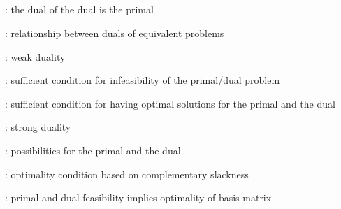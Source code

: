 \subsection*{}
\item {}: the dual of the dual is the primal
\item {}: relationship between duals of equivalent problems
\item {}: weak duality
\item {}: sufficient condition for infeasibility of the primal/dual problem
\item {}: sufficient condition for having optimal
solutions for the primal and the dual
\item {}: strong duality
\item {}: possibilities for the primal and the dual
\item {}: optimality condition based on complementary slackness
\item {}: primal and dual feasibility implies optimality of basis matrix
